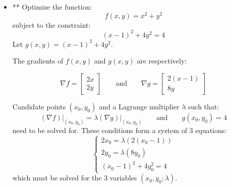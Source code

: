 \documentclass{article}
\begin{document}
\begin{itemize}
\item** Optimize the function:
\[f(x,y) = x^2 + y^2\]
subject to the constraint:
\[(x-1)^2 + 4y^2 = 4\]
Let \(g(x,y) = (x-1)^2 + 4y^2\).

The gradients of \(f(x, y)\) and \(g(x, y)\) are respectively:

\[\nabla f = \begin{bmatrix}
2x \\ 
2y  
\end{bmatrix}
\quad\quad\text{and}\quad\quad
\nabla g = \begin{bmatrix}
2(x-1) \\ 
8y 
\end{bmatrix}\]

Candidate points \((x_0, y_0)\) and a Lagrange multiplier \(\lambda\) such that:
\[(\nabla f)\Big|_{(x_0,y_0)} = \lambda (\nabla g)\Big|_{(x_0, y_0)} 
\quad\quad\text{and}\quad\quad 
g(x_0, y_0) = 4\]
need to be solved for. These conditions form a system of 3 equations:
\[\left\{\begin{array}{c}
2x_0 = \lambda (2(x_0 - 1)) \\ 
2y_0 = \lambda (8y_0) \\ 
(x_0-1)^2 + 4y_0^2 = 4 
\end{array}\right.\]
which must be solved for the 3 variables \((x_0, y_0; \lambda)\).


\end{itemize}
\end{document}
